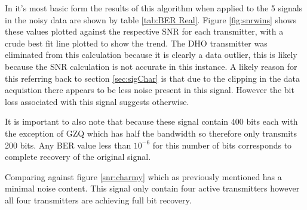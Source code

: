 In it's most basic form the results of this algorithm when applied to the 5 signals in the noisy data are shown by table \ref{tab:BER Real}. Figure \ref{fig:snrwins} shows these values plotted against the respective SNR for each transmitter, with a crude best fit line plotted to show the trend. The DHO transmitter was eliminated from this calculation because it is clearly a data outlier, this is likely because the SNR calculation is not accurate in this instance. A likely reason for this referring back to section \ref{sec:sigChar} is that due to the clipping in the data acquistion there appears to be less noise present in this signal. However the bit loss associated with this signal suggests otherwise. 

It is important to also note that because these signal contain 400 bits each with the exception of GZQ which has half the bandwidth so therefore only transmits 200 bits. Any BER value less than $10^{-6}$ for this number of bits corresponds to complete recovery of the original signal.

Comparing against figure \ref{snr:charmy} which as previously mentioned has a minimal noise content. This signal only contain four active transmitters however all four transmitters are achieving full bit recovery.

